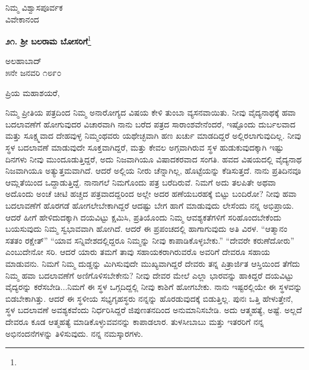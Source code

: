 \vspace{-0.5cm}

{\flushright
ನಿಮ್ಮ ವಿಶ್ವಾಸಪೂರ್ವಕ\\ವಿವೇಕಾನಂದ\par}

\begin{center}
\textbf{೨೧. ಶ‍್ರೀ ಬಲರಾಮ ಬೋಸರಿಗೆ}\footnote{}
\end{center}

\vspace{-0.5cm}

\begin{flushright}
ಅಲಹಾಬಾದ್\\೫ನೇ ಜನವರಿ ೧೮೯೦
\end{flushright}

\noindent
ಪ್ರಿಯ ಮಹಾಶಯರೆ,

ನಿಮ್ಮ ಪ್ರೀತಿಯ ಪತ್ರದಿಂದ ನಿಮ್ಮ ಅನಾರೋಗ್ಯದ ವಿಷಯ ಕೇಳಿ ತುಂಬಾ ವ್ಯಸನ\break ವಾಯಿತು. ನೀವು ವೈದ್ಯನಾಥಕ್ಕೆ ಹವಾ ಬದಲಾವಣೆಗೆ ಹೋಗುವುದರ ವಿಚಾರವಾಗಿ ನಾನು ಬರೆದ ಪತ್ರದ ಸಾರಾಂಶವೇನೆಂದರೆ, ಇಷ್ಟೊಂದು ದುರ್ಬಲವಾದ ಮತ್ತು ಸೂಕ್ಷ್ಮವಾದ ದೇಹವುಳ್ಳ ನಿಮ್ಮಂಥವರು ಯಥೇಚ್ಛವಾಗಿ ಹಣ ಖರ್ಚು ಮಾಡದಿದ್ದರೆ ಅಲ್ಲಿರಲಾಗುವುದಿಲ್ಲ. ನೀವು ಸ್ಥಳ ಬದಲಾವಣೆ ಮಾಡುವುದೇ ಸೂಕ್ತವಾಗಿದ್ದರೆ, ಮತ್ತು ಕೇವಲ ಅಗ್ಗವಾಗಿರುವ ಸ್ಥಳ ಹುಡುಕುವುದಕ್ಕಾಗಿ ಇಷ್ಟು ದಿನಗಳು ನೀವು ಮುಂದೂಡುತ್ತಿದ್ದರೆ, ಅದು ನಿಜವಾಗಿಯೂ ವಿಷಾದಕರವಾದ ಸಂಗತಿ. ಹವದ ವಿಷಯದಲ್ಲಿ ವೈದ್ಯನಾಥ ನಿಜವಾಗಿಯೂ ಅತ್ಯುತ್ತಮವಾಗಿದೆ. ಆದರೆ ಅಲ್ಲಿಯ ನೀರು ಚೆನ್ನಾಗಿಲ್ಲ, ಹೊಟ್ಟೆಯನ್ನು ಕೆಡಿಸುತ್ತದೆ. ನಾನು ಪ್ರತಿದಿನವೂ ಆಮ್ಲತೆಯಿಂದ  ಒದ್ದಾಡುತ್ತಿದ್ದೆ. ನಾನಾಗಲೆ ನಿಮಗೊಂದು ಪತ್ರ ಬರೆದಿರುವೆ. ನಿಮಗೆ ಅದು ತಲಪಿತೇ ಅಥವಾ ಅದೊಂದು ಅಂಚೆ ಚೀಟಿ ಹಚ್ಚದ ಪತ್ರವಾದದ್ದರಿಂದ ಅಲ್ಲೇ ಅದರ ಹಣೆಯಬರಹಕ್ಕೆ ಬಿಟ್ಟು ಬಂದಿರೋ? ನೀವು ಹವಾ ಬದಲಾವಣೆಗೆ ಹೊರಗಡೆ ಹೋಗಲೇಬೇಕಾಗಿದ್ದರೆ ಆದಷ್ಟು ಬೇಗ ಹಾಗೆ ಮಾಡುವುದು ಲೇಸೆಂದು ನನ್ನ ಅಭಿಪ್ರಾಯ. ಆದರೆ ಹೀಗೆ ಹೇಳಿದುದಕ್ಕಾಗಿ ದಯವಿಟ್ಟು ಕ್ಷಮಿಸಿ, ಪ್ರತಿಯೊಂದು ನಿಮ್ಮ ಆವಶ್ಯಕತೆಗಳಿಗೆ ಸರಿಹೊಂದಬೇಕೆಂದು ಬಯಸುವುದು ನಿಮ್ಮ ಸ್ವಭಾವವಾಗಿ ಹೋಗಿದೆ. ಆದರೆ ಈ ಪ್ರಪಂಚದಲ್ಲಿ ಹಾಗಾಗುವುದು ಅತಿ ವಿರಳ. “ಆತ್ಮಾನಂ ಸತತಂ ರಕ್ಷೇತ್” “ಯಾವ ಸನ್ನಿವೇಶದಲ್ಲಿದ್ದರೂ ನಿಮ್ಮನ್ನು ನೀವು ಕಾಪಾಡಿಕೊಳ್ಳಬೇಕು.” “ದೇವರೇ ಕರುಣೆದೋರು” ಎಂಬುದೇನೋ ಸರಿ. ಆದರೆ ಯಾರು ತಮಗೆ ತಾವು ಸಹಾಯಕರಾಗಿರುವರೊ ಅವರಿಗೆ ದೇವರೂ ಸಹಾಯ ಮಾಡುವನು. ನಿಮಗೆ ನಿಮ್ಮ ದುಡ್ಡನ್ನು ಮಿಗಿಸುವುದೇ ಮುಖ್ಯವಾಗಿದ್ದರೆ ದೇವರು ತನ್ನ ಪಿತ್ರಾರ್ಜಿತ ಆಸ್ತಿಯಿಂದ ತೆಗೆದು ನಿಮ್ಮ ಹವಾ ಬದಲಾವಣೆಗೆ ಅಣಿಗೊಳಿಸಬೇಕೇನು? ನೀವು ದೇವರ ಮೇಲೆ ಎಲ್ಲಾ ಭಾರವನ್ನು ಹಾಕಿದ್ದರೆ ದಯವಿಟ್ಟು ವೈದ್ಯರನ್ನು ಕರೆಸಬೇಡಿ...ನಿಮಗೆ ಈ ಸ್ಥಳ ಒಗ್ಗದಿದ್ದಲ್ಲಿ ನೀವು ಕಾಶಿಗೆ ಹೋಗಬೇಕು. ನಾನು ಇಷ್ಟರಲ್ಲಿಯೇ ಈ ಸ್ಥಳವನ್ನು ಬಿಡಬೇಕಾಗಿತ್ತು. ಆದರೆ ಈ ಸ್ಥಳೀಯ ಸಭ್ಯಗೃಹಸ್ಥರು ನನ್ನನ್ನು ಹೊರಡುವುದಕ್ಕೆ ಬಿಡುತ್ತಿಲ್ಲ. ಪುನಃ ಒತ್ತಿ ಹೇಳುತ್ತೇನೆ, ಸ್ಥಳ ಬದಲಾವಣೆ ಅವಶ್ಯಕವೆಂದು ನಿರ್ಧರಿಸಿದ್ದರೆ ಜಿಪುಣತನದಿಂದ ಅನುಮಾನಿಸಬೇಡಿ. ಅದು ಆತ್ಮಹತ್ಯೆ, ಅಷ್ಟೆ. ಅಲ್ಲದೆ ದೇವರೂ ಕೂಡ ಆತ್ಮಹತ್ಯೆ ಮಾಡಿಕೊಳ್ಳುವವನನ್ನು ಕಾಪಾಡಲಾರ. ತುಳಸೀಬಾಬು ಮತ್ತು ಇತರರಿಗೆ ನನ್ನ ಅಭಿನಂದನೆಗಳನ್ನು ತಿಳಿಸುವುದು. ನನ್ನ ನಮಸ್ಕಾರಗಳು.

